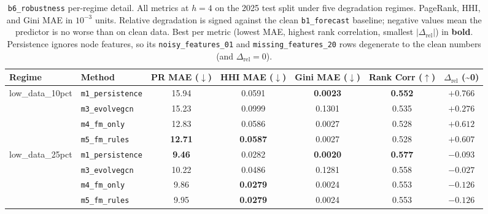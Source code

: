 \begin{table}[!htbp]
\centering
\footnotesize
\setlength{\tabcolsep}{4pt}
\caption{\texttt{b6\_robustness} per-regime detail. All metrics at $h{=}4$
on the 2025 test split under five degradation regimes. PageRank, HHI, and
Gini MAE in $10^{-3}$ units. Relative degradation is signed against the
clean \texttt{b1\_forecast} baseline; negative values mean the predictor is
no worse than on clean data. Best per metric (lowest MAE, highest rank
correlation, smallest $|\Delta_{\mathrm{rel}}|$) in \textbf{bold}.
Persistence ignores node features, so its \texttt{noisy\_features\_01} and
\texttt{missing\_features\_20} rows degenerate to the clean numbers (and
$\Delta_{\mathrm{rel}}=0$).}
\label{tab:b6_detail}
\begin{tabular}{l l c c c c c}
\toprule
Regime & Method & PR MAE ($\downarrow$) & HHI MAE ($\downarrow$) & Gini MAE ($\downarrow$) & Rank Corr ($\uparrow$) & $\Delta_{\mathrm{rel}}$ (\textasciitilde 0) \\
\midrule
\multirow{4}{*}{low\_data\_10pct}
& \texttt{m1\_persistence} & 15.94          & 0.0591          & \textbf{0.0023} & \textbf{0.552} & $+0.766$ \\
& \texttt{m3\_evolvegcn}   & 15.23          & 0.0999          & 0.1301          & 0.535          & $+0.276$ \\
& \texttt{m4\_fm\_only}    & 12.83          & 0.0586          & 0.0027          & 0.528          & $+0.612$ \\
& \texttt{m5\_fm\_rules}   & \textbf{12.71} & \textbf{0.0587} & 0.0027          & 0.528          & $\mathbf{+0.607}$ \\
\midrule
\multirow{4}{*}{low\_data\_25pct}
& \texttt{m1\_persistence} & \textbf{9.46}  & 0.0282          & \textbf{0.0020} & \textbf{0.577} & $-0.093$ \\
& \texttt{m3\_evolvegcn}   & 10.22          & 0.0486          & 0.1281          & 0.558          & $\mathbf{-0.027}$ \\
& \texttt{m4\_fm\_only}    & 9.86           & \textbf{0.0279} & 0.0024          & 0.553          & $-0.126$ \\
& \texttt{m5\_fm\_rules}   & 9.95           & \textbf{0.0279} & 0.0024          & 0.553          & $-0.126$ \\

\end{tabular}
\end{table}
